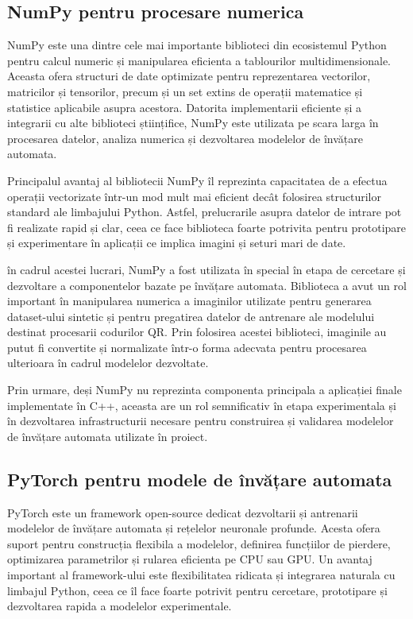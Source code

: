 \subsection*{NumPy pentru procesare numerica}

NumPy este una dintre cele mai importante biblioteci din ecosistemul Python pentru calcul numeric și manipularea eficienta a tablourilor multidimensionale. Aceasta ofera structuri de date optimizate pentru reprezentarea vectorilor, matricilor și tensorilor, precum și un set extins de operații matematice și statistice aplicabile asupra acestora. Datorita implementarii eficiente și a integrarii cu alte biblioteci științifice, NumPy este utilizata pe scara larga în procesarea datelor, analiza numerica și dezvoltarea modelelor de învățare automata.

Principalul avantaj al bibliotecii NumPy îl reprezinta capacitatea de a efectua operații vectorizate într-un mod mult mai eficient decât folosirea structurilor standard ale limbajului Python. Astfel, prelucrarile asupra datelor de intrare pot fi realizate rapid și clar, ceea ce face biblioteca foarte potrivita pentru prototipare și experimentare în aplicații ce implica imagini și seturi mari de date.

în cadrul acestei lucrari, NumPy a fost utilizata în special în etapa de cercetare și dezvoltare a componentelor bazate pe învățare automata. Biblioteca a avut un rol important în manipularea numerica a imaginilor utilizate pentru generarea dataset-ului sintetic și pentru pregatirea datelor de antrenare ale modelului destinat procesarii codurilor QR. Prin folosirea acestei biblioteci, imaginile au putut fi convertite și normalizate într-o forma adecvata pentru procesarea ulterioara în cadrul modelelor dezvoltate.

Prin urmare, deși NumPy nu reprezinta componenta principala a aplicației finale implementate în C++, aceasta are un rol semnificativ în etapa experimentala și în dezvoltarea infrastructurii necesare pentru construirea și validarea modelelor de învățare automata utilizate în proiect.

\subsection*{PyTorch pentru modele de învățare automata}

PyTorch este un framework open-source dedicat dezvoltarii și antrenarii modelelor de învățare automata și rețelelor neuronale profunde. Acesta ofera suport pentru construcția flexibila a modelelor, definirea funcțiilor de pierdere, optimizarea parametrilor și rularea eficienta pe CPU sau GPU. Un avantaj important al framework-ului este flexibilitatea ridicata și integrarea naturala cu limbajul Python, ceea ce îl face foarte potrivit pentru cercetare, prototipare și dezvoltarea rapida a modelelor experimentale.

